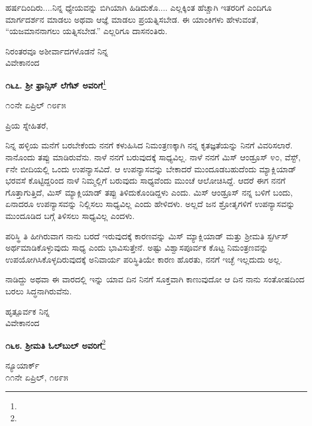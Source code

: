 \eject

ಹರ್ಷದಿಂದಿರು....ನಿನ್ನ ಧ್ಯೇಯವನ್ನು ಬಿಗಿಯಾಗಿ ಹಿಡಿದುಕೊ.... ಎಲ್ಲಕ್ಕಿಂತ ಹೆಚ್ಚಾಗಿ ಇತರರಿಗೆ ಎಂದಿಗೂ ಮಾರ್ಗದರ್ಶನ ಮಾಡಲು ಅಥವಾ ಆಜ್ಞೆ ಮಾಡಲು ಪ್ರಯತ್ನಿಸಬೇಡ. ಈ ಯಾಂಕಿಗಳು ಹೇಳುವಂತೆ, ``ಯಜಮಾನನಾಗಲು ಯತ್ನಿಸಬೇಡ.'' ಎಲ್ಲರಿಗೂ ದಾಸನಂತಿರು.

{\flushright
ನಿರಂತರವೂ ಅಶೀರ್ವಾದಗಳೊಡನೆ ನಿನ್ನ\\ವಿವೇಕಾನಂದ\par}

\begin{center}
\textbf{೧೬೭. ಶ‍್ರೀ ಫ್ರಾನ್ಸಿಸ್ ಲೆಗೆಟ್ ಅವರಿಗೆ}\footnote{}
\end{center}

\begin{flushright}
೧೦ನೇ ಏಪ್ರಿಲ್ ೧೮೯೫
\end{flushright}

\noindent
ಪ್ರಿಯ ಸ್ನೇಹಿತರೆ,

ನಿನ್ನ ಹಳ್ಳಿಯ ಮನೆಗೆ ಬರಬೇಕೆಂದು ನನಗೆ ಕಳುಹಿಸಿದ ನಿಮಂತ್ರಣಕ್ಕಾಗಿ ನನ್ನ ಕೃತಜ್ಞತೆಯನ್ನು ನಿನಗೆ ವಿವರಿಸಲಾರೆ. ನಾನೊಂದು ತಪ್ಪು ಮಾಡಿರುವೆನು. ನಾಳೆ ನನಗೆ ಬರುವುದಕ್ಕೆ ಸಾಧ್ಯವಿಲ್ಲ. ನಾಳೆ ನನಗೆ ಮಿಸ್ ಆಂಡ್ರೂಸ್ ೪೦, ವೆಸ್ಟ್, ೯ನೇ ಬೀದಿಯಲ್ಲಿ ಒಂದು ಉಪನ್ಯಾಸವಿದೆ. ಆ ಉಪನ್ಯಾಸವನ್ನು ಬೇಕಾದರೆ ಮುಂದೂಡಬಹುದೆಂದು ಮ್ಯಾಕ್ಲಿಯಾಡ್ ಭರವಸೆ ಕೊಟ್ಟಿದ್ದರಿಂದ ನಾಳೆ ನಿಮ್ಮಲ್ಲಿಗೆ ಬರುವುದು ಸಾಧ್ಯವೆಂದು ಮುಂಚೆ ಆಲೋಚಿಸಿದ್ದೆ. ಆದರೆ ಈಗ ನನಗೆ ಗೊತ್ತಾಗುತ್ತಿದೆ, ಮಿಸ್ ಮ್ಯಾಕ್ಲಿಯಾಡ್ ತಪ್ಪು ತಿಳಿದುಕೊಂಡಿದ್ದಳು ಎಂದು. ಮಿಸ್ ಆಂಡ್ರೂಸ್ ನನ್ನ ಬಳಿಗೆ ಬಂದು, ಏನಾದರೂ ಉಪನ್ಯಾಸವನ್ನು ನಿಲ್ಲಿಸಲು ಸಾಧ್ಯವಿಲ್ಲ ಎಂದು ಹೇಳಿದಳು. ಅಲ್ಲದೆ  ಜನ ಶ್ರೋತೃಗಳಿಗೆ ಉಪನ್ಯಾಸವನ್ನು ಮುಂದೂಡಿದ ಬಗ್ಗೆ ತಿಳಿಸಲು ಸಾಧ್ಯವಿಲ್ಲ ಎಂದಳು.

ಪರಿಸ್ಥಿ ತಿ ಹೀಗಿರುವಾಗ ನಾನು ಬರದೆ ಇರುವುದಕ್ಕೆ ಕಾರಣವನ್ನು ಮಿಸ್ ಮ್ಯಾಕ್ಲಿಯಾಡ್ ಮತ್ತು ಶ‍್ರೀಮತಿ ಸ್ಟರ್ಗಿಸ್ ಅರ್ಥಮಾಡಿಕೊಳ್ಳುವುದು ಸಾಧ್ಯ ಎಂದು ಭಾವಿಸುತ್ತೇನೆ. ಅಷ್ಟು ವಿಶ್ವಾಸಪೂರ್ವಕ ಕೊಟ್ಟ ನಿಮಂತ್ರಣವನ್ನು ಉಪಯೋಗಿಸಿಕೊಳ್ಳದಿರುವುದಕ್ಕೆ ಅನಿವಾರ್ಯ ಪರಿಸ್ಥಿತಿಯೇ ಕಾರಣ ಹೊರತು, ನನಗೆ ಇಚ್ಛೆ ಇಲ್ಲದುದು ಅಲ್ಲ.

ನಾಡಿದ್ದು ಅಥವಾ ಈ ವಾರದಲ್ಲಿ ಇನ್ನು ಯಾವ ದಿನ ನಿನಗೆ ಸೂಕ್ತವಾಗಿ ಕಾಣುವುದೋ ಆ ದಿನ ನಾನು ಸಂತೋಷದಿಂದ ಬರಲು ಸಿದ್ಧನಾಗಿರುವೆನು.

{\flushright
ಹೃತ್ಪೂರ್ವಕ ನಿನ್ನ\\ವಿವೇಕಾನಂದ\par}

\begin{center}
\textbf{೧೬೮. ಶ‍್ರೀಮತಿ ಓಲ್‌ಬುಲ್‌ ಅವರಿಗೆ}\footnote{}
\end{center}

\begin{flushright}
ನ್ಯೂಯಾರ್ಕ್\\೧೧ನೇ ಏಪ್ರಿಲ್, ೧೮೯೫
\end{flushright}

